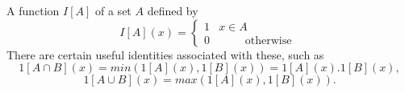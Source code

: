 A function  $ I[A] $  of a set  $ A $  defined by
\[  I[A](x) =  
\left \{ \begin{array}{cc} 
  1 & x \in A \\ 
  0 &  \qquad\mbox{  otherwise  } 
\end{array} \right. 
\]
There are certain useful identities associated with these, such as
 \[ 1[A \cap B](x)= min(1[A](x),1[B](x)) = 1[A](x).1[B](x), \]
 \[ 1[A \cup B](x)= max(1[A](x),1[B](x)).\]